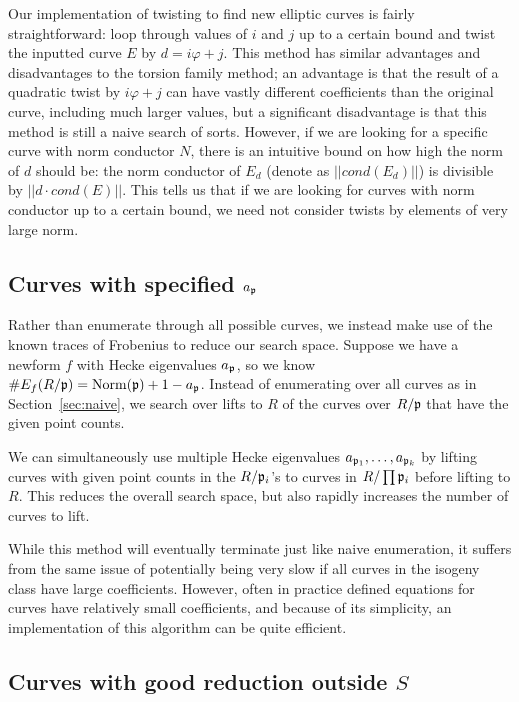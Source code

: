 \documentclass{amsart}
\begin{document}
Our implementation of twisting to find new elliptic curves is fairly straightforward: loop through values of $i$ and $j$ up to a certain bound and twist the inputted curve $E$ by $d = i\varphi+j$. This method has similar advantages and disadvantages to the torsion family method; an advantage is that the result of a quadratic twist by $i\varphi+j$ can have vastly different coefficients than the original curve, including much larger values, but a significant disadvantage is that this method is still a naive search of sorts. However, if we are looking for a specific curve with norm conductor $N$, there is an intuitive bound on how high the norm of $d$ should be: the norm conductor of $E_d$ (denote as $||cond(E_d)||$) is divisible by $||d\cdot cond(E)||$. This tells us that if we are looking for curves with norm conductor up to a certain bound, we need not consider twists by elements of very large norm.

\subsection{Curves with specified $a_{\mathfrak{p}}$}

Rather than enumerate through all possible curves, we instead make use
of the known traces of Frobenius to reduce our search space. Suppose
we have a newform $f$ with Hecke eigenvalues $a_{\mathfrak{p}}$, so we know
$\#E_f(R/\mathfrak{p})=\operatorname{Norm}(\mathfrak{p})+1-a_{\mathfrak{p}}$. Instead of enumerating over all
curves as in Section~\ref{sec:naive}, we search over lifts to $R$ of the
curves over $R/\mathfrak{p}$ that have the given point counts.

We can simultaneously use multiple Hecke eigenvalues
$a_{\mathfrak{p}_1},\ldots,a_{\mathfrak{p}_k}$ by lifting curves with given point counts
in the $R/\mathfrak{p}_i$'s to curves in $R/\prod \mathfrak{p}_i$ before lifting to
$R$. This reduces the overall search space, but also rapidly increases
the number of curves to lift.

While this method will eventually terminate just like naive
enumeration, it suffers from the same issue of potentially being very
slow if all curves in the isogeny class have large
coefficients. However, often in practice defined equations for curves
have relatively small coefficients, and because of its simplicity, an
implementation of this algorithm can be quite efficient. 


\subsection{Curves with good reduction outside $S$}
\end{document}
